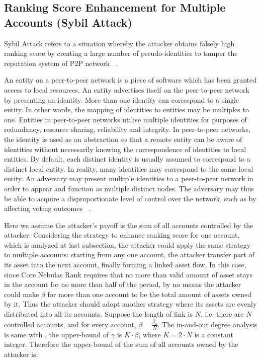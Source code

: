 \subsection{Ranking Score Enhancement for Multiple Accounts (Sybil Attack)}
Sybil Attack refers to a situation whereby the attacker obtains falsely high ranking score by creating a large number of pseudo-identities to tamper the reputation system of P2P network ~\cite{quercia2010sybil}.

An entity on a peer-to-peer network is a piece of software which has been granted access to local resources. An entity advertises itself on the peer-to-peer network by presenting an identity. More than one identity can correspond to a single entity. In other words, the mapping of identities to entities may be multiples to one. Entities in peer-to-peer networks utilise multiple identities for purposes of redundancy, resource sharing, reliability and integrity. In peer-to-peer networks, the identity is used as an abstraction so that a remote entity can be aware of identities without necessarily knowing the correspondence of identities to local entities. By default, each distinct identity is usually assumed to correspond to a distinct local entity. In reality, many identities may correspond to the same local entity. An adversary may present multiple identities to a peer-to-peer network in order to appear and function as multiple distinct nodes. The adversary may thus be able to acquire a disproportionate level of control over the network, such as by affecting voting outcomes ~\cite{wiki:sybil}.

Here we assume the attacker's payoff is the sum of all accounts controlled by the attacker. Considering the strategy to enhance ranking score for one account, which is analyzed at last subsection, the attacker could apply the same strategy to multiple accounts: starting from any one account, the attacker transfer part of its asset into the next account, finally forming a linked asset flow. In this case, since Core Nebulas Rank requires that no more than valid amount of asset stays in the account for no more than half of the period, by no means the attacker could make $\beta$ for more than one account to be the total amount of assets owned by it. Thus the attacker should adopt another strategy where its assets are evenly distributed into all its accounts. Suppose the length of link is $N$, i.e. there are $N$ controlled accounts, and for every account, $\beta = \frac{\beta_0}{N}$. The in-and-out degree analysis is same with , the upper-bound of $\gamma$ is $K \cdot \beta$, where $K=2\cdot N$ is a constant integer. Therefore the upper-bound of the sum of all accounts owned by the attacker is:

